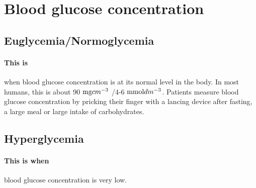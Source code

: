 \section{Blood glucose concentration}
\subsection{Euglycemia/Normoglycemia}
\paragraph{This is}when blood glucose concentration is at its normal level in the body. In most humans, this is about 90 $\textnormal{mg} cm^{-3}$ /4-6 $\textnormal{mmol} dm^{-3}$. Patients measure blood glucose concentration by pricking their finger with a lancing device after fasting, a large meal or large intake of carbohydrates.
\subsection{Hyperglycemia}
\paragraph{This is when}blood glucose concentration is very low.
